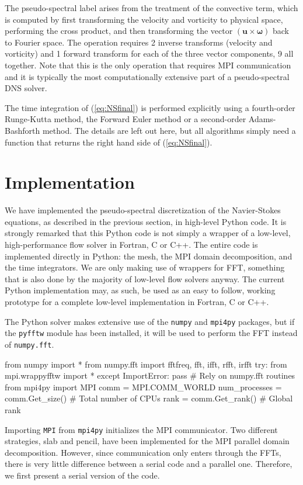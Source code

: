 \documentclass[11pt, oneside]{article}
\begin{document}
The pseudo-spectral label arises from the treatment of the convective term, which is computed by first transforming the velocity and vorticity to physical space, performing the cross product, and then transforming the vector ${(\bm{u}  \times  \bm{\omega})}$  back to Fourier space. The operation requires 2 inverse transforms (velocity and vorticity) and 1 forward transform for each of the three vector components, 9 all together. Note that this is the only operation that requires MPI communication and it is typically the most computationally extensive part of a pseudo-spectral DNS solver.

The time integration of (\ref{eq:NSfinal}) is performed explicitly using a fourth-order Runge-Kutta method, the Forward Euler method or a second-order Adams-Bashforth method. The details are left out here, but all algorithms simply need a function that returns the right hand side of (\ref{eq:NSfinal}).

\section{Implementation}

We have implemented the pseudo-spectral discretization of the Navier-Stokes equations, as described in the previous section, in high-level Python code. It is strongly remarked that this Python code is not simply a wrapper of a low-level, high-performance flow solver in Fortran, C or C++. The entire code is implemented directly in Python: the mesh, the MPI domain decomposition, and the time integrators. We are only making use of wrappers for FFT, something that is also done by the majority of low-level flow solvers anyway. The current Python implementation may, as such, be used as an easy to follow, working prototype for a complete low-level implementation in Fortran, C or C++.

The Python solver makes extensive use of the \texttt{numpy} and \texttt{mpi4py} packages, but if the \texttt{pyfftw} module has been installed, it will be used to perform the FFT instead of \texttt{numpy.fft}.

\begin{python}
from numpy import *
from numpy.fft import fftfreq, fft, ifft, rfft, irfft
try:
    from mpi.wrappyfftw import *
except ImportError:
    pass # Rely on numpy.fft routines
from mpi4py import MPI
comm = MPI.COMM_WORLD
num_processes = comm.Get_size() # Total number of CPUs
rank = comm.Get_rank()          # Global rank
\end{python}
Importing \texttt{MPI} from \texttt{mpi4py} initializes the MPI communicator. Two different strategies, slab and pencil, have been implemented for the MPI parallel domain decomposition. However, since communication only enters through the FFTs, there is very little difference between a serial code and a parallel one. Therefore, we first present a serial version of the code.
\end{document}
